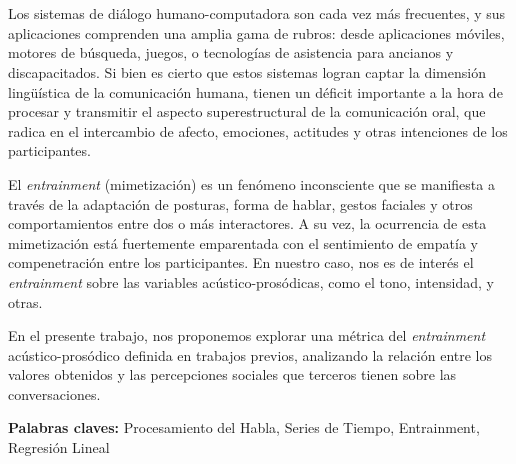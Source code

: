 \chapter*{\runtitulo}


Los sistemas de diálogo humano-computadora son cada vez más frecuentes, y sus aplicaciones comprenden una amplia gama de rubros: desde aplicaciones móviles, motores de búsqueda, juegos, o tecnologías de asistencia para ancianos y discapacitados. Si bien es cierto que estos sistemas logran captar la dimensión lingüística de la comunicación humana, tienen un déficit importante a la hora de procesar y transmitir el aspecto superestructural de la comunicación oral, que radica en el intercambio de afecto, emociones, actitudes y otras intenciones de los participantes.

\noindent El \emph{entrainment} (mimetización) es un fenómeno inconsciente que se manifiesta a través de la adaptación de posturas, forma de hablar, gestos faciales y otros comportamientos entre dos o más interactores. A su vez, la ocurrencia de esta mimetización está fuertemente emparentada con el sentimiento de empatía y compenetración entre los participantes. En nuestro caso, nos es de interés el \emph{entrainment} sobre las variables acústico-prosódicas, como el tono, intensidad, y otras.

En el presente trabajo, nos proponemos explorar una métrica del \emph{entrainment} acústico-prosódico definida en trabajos previos, analizando la relación entre los valores obtenidos y las percepciones sociales que terceros tienen sobre las conversaciones.

\bigskip

\noindent\textbf{Palabras claves:} Procesamiento del Habla, Series de Tiempo, Entrainment, Regresión Lineal
